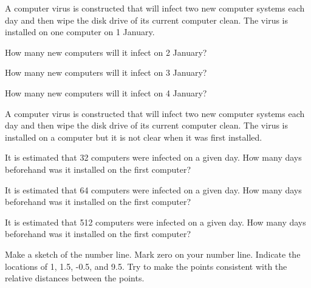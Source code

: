 
\begin{problem}
\item A computer virus is constructed that will infect two new
  computer systems each day and then wipe the disk drive of its
  current computer clean.  The virus is installed on one computer on
  1 January.
  \begin{subproblem}
  \item How many new computers will it infect on 2 January?
    \vfill
  \item How many new computers will it infect on 3 January?
    \vfill
  \item How many new computers will it infect on 4 January?
    \vfill
  \end{subproblem}
\item A computer virus is constructed that will infect two new
  computer systems each day and then wipe the disk drive of its
  current computer clean.  The virus is installed on a computer but it
  is not clear when it was first installed.
  \begin{subproblem}
  \item It is estimated that 32 computers were infected on a given
    day. How many days beforehand was it installed on the first computer?
    \vfill
  \item It is estimated that 64 computers were infected on a given
    day. How many days beforehand was it installed on the first computer?
    \vfill
  \item It is estimated that 512 computers were infected on a given
    day. How many days beforehand was it installed on the first computer?
    \vfill
  \end{subproblem}
\item Make a sketch of the number line. Mark zero on your number
  line. Indicate the locations of 1, 1.5, -0.5, and 9.5. Try to make
  the points consistent with the relative distances between the points.
\end{problem}


